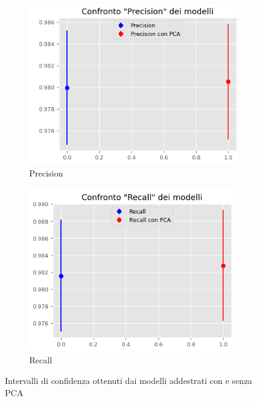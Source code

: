 \begin{figure}[!ht]
\begin{subfigure}[b]{0.4\textwidth}
        \centering
        \includegraphics[width=\textwidth]{img/rete/intervalliPrecision.png}
        \caption{Precision}
        \label{fig:precision_pca}
    \end{subfigure}
    \hfill
    \begin{subfigure}[b]{0.4\textwidth}
        \centering
        \includegraphics[width=\textwidth]{img/rete/intervalliRecall.png}
        \caption{Recall}
        \label{fig:recall_pca}
    \end{subfigure}
    \caption{Intervalli di confidenza ottenuti dai modelli addestrati con e senza PCA}
    \label{fig:intervalli_confidenza_pca}
\end{figure}

